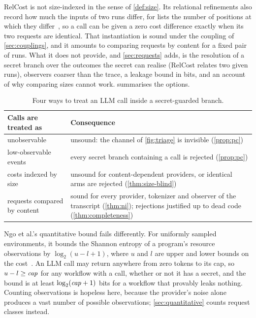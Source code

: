 RelCost is not size-indexed in the sense of \cref{def:size}. Its relational
refinements also record how much the inputs of two runs differ, for lists the
number of positions at which they differ~\cite{cicek2017relational}, so a call can be
given a zero cost difference exactly when its two requests are identical. That
instantiation is sound under the coupling of \cref{sec:couplings}, and it amounts to
comparing requests by content for a fixed pair of runs. What it does not provide,
and \cref{sec:requests} adds, is the resolution of a secret branch over the outcomes
the secret can realise (RelCost relates two given runs), observers coarser than the
trace, a leakage bound in bits, and an account of why comparing sizes cannot work.
 summarises the options.

\begin{table}[t]
\centering
\caption{Four ways to treat an LLM call inside a secret-guarded branch.}
\label{tab:options}
\begin{tabularx}{\textwidth}{@{}lX@{}}
\toprule
Calls are treated as & Consequence \\
\midrule
unobservable & unsound: the channel of \cref{fig:triage} is invisible (\cref{prop:pc}) \\
low-observable events & every secret branch containing a call is rejected (\cref{prop:pc}) \\
costs indexed by size & unsound for content-dependent providers, or identical arms are rejected (\cref{thm:size-blind}) \\
requests compared by content & sound for every provider, tokenizer and observer of the transcript (\cref{thm:ni}); rejections justified up to dead code (\cref{thm:completeness}) \\
\bottomrule
\end{tabularx}
\end{table}

Ngo et al.'s quantitative bound fails differently. For uniformly sampled
environments, it bounds the Shannon entropy of a program's resource observations by
$\log_2(u - l + 1)$, where $u$ and $l$ are upper and lower bounds on the
cost~\cite[Section V-A, Lemmas 6 and 7]{ngo2017verifying}. An LLM call may return anywhere
from zero tokens to its cap, so $u - l \geq \mathit{cap}$ for any workflow with a call,
whether or not it has a secret, and the bound is at least $\log_2(\mathit{cap} + 1)$ bits for
a workflow that provably leaks nothing. Counting observations is hopeless here,
because the provider's noise alone produces a vast number of possible observations;
\cref{sec:quantitative} counts request classes instead.
